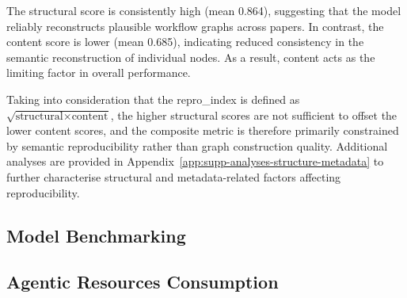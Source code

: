 \documentclass{article}
\begin{document}
The structural score is consistently high (mean 0.864), suggesting that the model reliably reconstructs plausible workflow graphs across papers. In contrast, the content score is lower (mean 0.685), indicating reduced consistency in the semantic reconstruction of individual nodes. As a result, content acts as the limiting factor in overall performance.

Taking into consideration that the repro\_index is defined as $\sqrt{\text{structural} \times \text{content}}$, the higher structural scores are not sufficient to offset the lower content scores, and the composite metric is therefore primarily constrained by semantic reproducibility rather than graph construction quality. Additional analyses are provided in Appendix~\ref{app:supp-analyses-structure-metadata} to further characterise structural and metadata-related factors affecting reproducibility.




\subsection{Model Benchmarking}

        


\subsection{Agentic Resources Consumption}
\end{document}

